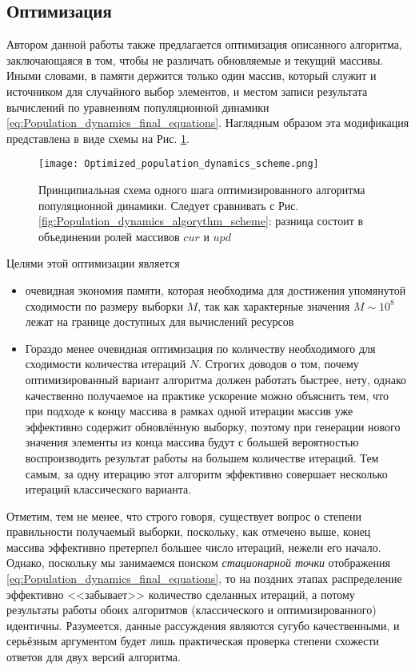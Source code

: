 \subsection{Оптимизация}
Автором данной работы также предлагается оптимизация описанного алгоритма, заключающаяся в том, чтобы не различать обновляемые и текущий массивы. Иными словами, в памяти держится только один массив, который служит и источником для случайного выбор элементов, и местом записи результата вычислений по уравнениям популяционной динамики \eqref{eq:Population_dynamics_final_equations}. Наглядным образом эта модификация представлена в виде схемы на Рис. \ref{fig:Optimized_PD_scheme}.
\begin{figure}[h]
	\label{fig:Optimized_PD_scheme}
	\centering
	\texttt{[image: Optimized\_population\_dynamics\_scheme.png]}
	\caption{Принципиальная схема одного шага оптимизированного алгоритма популяционной динамики. Следует сравнивать с Рис. \ref{fig:Population_dynamics_algorythm_scheme}: разница состоит в объединении ролей массивов $cur$ и $upd$}
\end{figure} 

Целями этой оптимизации является
\begin{itemize}
	\item очевидная экономия памяти, которая необходима для достижения упомянутой сходимости по размеру выборки $M$, так как характерные значения $M \sim 10^8$ лежат на границе доступных для вычислений ресурсов
	\item Гораздо менее очевидная оптимизация по количеству необходимого для сходимости количества итераций $N$. Строгих доводов о том, почему оптимизированный вариант алгоритма должен работать быстрее, нету, однако качественно получаемое на практике ускорение можно объяснить тем, что при подходе к концу массива в рамках одной итерации массив уже эффективно содержит обновлённую выборку, поэтому при генерации нового значения элементы из конца массива будут с большей вероятностью воспроизводить результат работы на большем количестве итераций. Тем самым, за одну итерацию этот алгоритм эффективно совершает несколько итераций классического варианта.
\end{itemize} 

Отметим, тем не менее, что строго говоря, существует вопрос о степени правильности получаемый выборки, поскольку, как отмечено выше, конец массива эффективно претерпел большее число итераций, нежели его начало. Однако, поскольку мы занимаемся поиском \textit{стационарной точки} отображения \eqref{eq:Population_dynamics_final_equations}, то на поздних этапах распределение эффективно <<забывает>> количество сделанных итераций, а потому результаты работы обоих алгоритмов (классического и оптимизированного) идентичны. Разумеется, данные рассуждения являются сугубо качественными, и серьёзным аргументом будет лишь практическая проверка степени схожести ответов для двух версий алгоритма.



